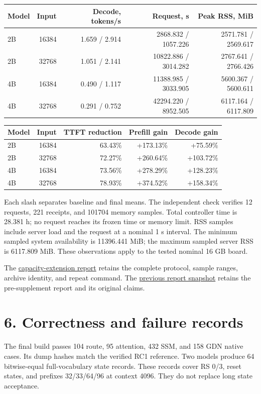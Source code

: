 \documentclass[10pt,a4paper]{article}
\begin{document}
\begin{longtable}[]{@{}lrrrr@{}}
\toprule
Model & Input & Decode, tokens/s & Request, s & Peak RSS,
MiB\tabularnewline
\midrule
\endhead
2B & 16384 & 1.659 / 2.914 & 2868.832 / 1057.226 & 2571.781 /
2569.617\tabularnewline
2B & 32768 & 1.051 / 2.141 & 10822.886 / 3014.282 & 2767.641 /
2766.426\tabularnewline
4B & 16384 & 0.490 / 1.117 & 11388.985 / 3033.905 & 5600.367 /
5600.611\tabularnewline
4B & 32768 & 0.291 / 0.752 & 42294.220 / 8952.505 & 6117.164 /
6117.809\tabularnewline
\bottomrule
\end{longtable}

\begin{longtable}[]{@{}lrrrr@{}}
\toprule
Model & Input & TTFT reduction & Prefill gain & Decode
gain\tabularnewline
\midrule
\endhead
2B & 16384 & 63.43\% & +173.13\% & +75.59\%\tabularnewline
2B & 32768 & 72.27\% & +260.64\% & +103.72\%\tabularnewline
4B & 16384 & 73.56\% & +278.29\% & +128.23\%\tabularnewline
4B & 32768 & 78.93\% & +374.52\% & +158.34\%\tabularnewline
\bottomrule
\end{longtable}

Each slash separates baseline and final means. The independent check
verifies 12 requests, 221 receipts, and 101704 memory samples. Total
controller time is 28.381 h; no request reaches its frozen time or
memory limit. RSS samples include server load and the request at a
nominal 1 s interval. The minimum sampled system availability is
11396.441 MiB; the maximum sampled server RSS is 6117.809 MiB. These
observations apply to the tested nominal 16 GB board.

The
\href{https://github.com/MoyaMryia/riscv-accl/blob/main/spacemit/reports/2026-10-16-ultralong-final-comparison.md}{capacity-extension
report} retains the complete protocol, sample ranges, archive identity,
and repeat command. The
\href{https://github.com/MoyaMryia/riscv-accl/blob/main/spacemit/reports/snapshots/2026-10-14-final-r3/SUBMISSION-REPORT.pdf}{previous
report snapshot} retains the pre-supplement report and its original
claims.

\hypertarget{correctness-and-failure-records}{%
\section{6. Correctness and failure
records}\label{correctness-and-failure-records}}

The final build passes 104 route, 95 attention, 432 SSM, and 158 GDN
native cases. Its dump hashes match the verified RC1 reference. Two
models produce 64 bitwise-equal full-vocabulary state records. These
records cover RS 0/3, reset states, and prefixes 32/33/64/96 at context
4096. They do not replace long state acceptance.
\end{document}
